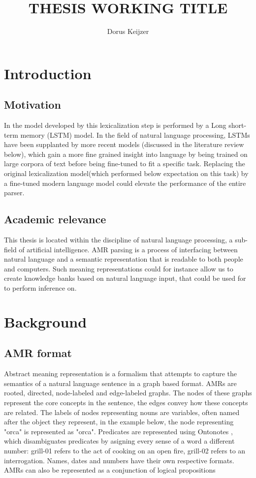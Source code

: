 \documentclass[twocolumn]{article}
\title{THESIS WORKING TITLE}
\author{Dorus Keijzer}
\begin{document}
\maketitle
\section{Introduction}

\subsection{Motivation}
In the model developed by \textcite{groschwitz-etal-2018-amr} this lexicalization step is performed by a Long short-term memory (LSTM) \parencite{LSTM} model. In the field of natural language processing, LSTMs have been supplanted by more recent models (discussed in the literature review below), which gain a more fine grained insight into language by being trained on large corpora of text before being fine-tuned to fit a specific task. Replacing the original lexicalization model(which performed below expectation on this task) by a fine-tuned modern language model could elevate the performance of the entire parser. 

\subsection{Academic relevance}
This thesis is located within the discipline of natural language processing, a sub-field of artificial intelligence. AMR parsing is a process of interfacing between natural language and a semantic representation that is readable to both people and computers. Such meaning representations could for instance allow us to create knowledge banks based on natural language input, that could be used for to perform inference on.

\section{Background}

\subsection{AMR format}
Abstract meaning representation \parencite{banarescu-etal-2013-abstract} is a formalism that attempts to capture the semantics of a natural language sentence in a graph based format. AMRs are rooted, directed, node-labeled and edge-labeled graphs. The nodes of these graphs represent the core concepts in the sentence, the edges convey how these concepts are related. The labels of nodes representing nouns are variables, often named after the object they represent, in the example below, the node representing "orca" is represented as "orca". Predicates are represented using Ontonotes \parencite{hovy-etal-2006-ontonotes}, which disambiguates predicates by asigning every sense of a word a different number: grill-01 refers to the act of cooking on an open fire, grill-02 refers to an interrogation. Names, dates and numbers have their own respective formats. 
AMRs can also be represented as a conjunction of logical propositions
\end{document}
